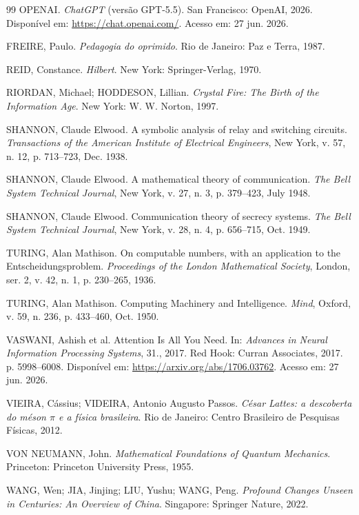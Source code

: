 \documentclass{hipatia}
\begin{document}
{\begin{thebibliography}{99}
OPENAI.
\textit{ChatGPT} (versão GPT-5.5).
San Francisco: OpenAI, 2026.
Disponível em:
\url{https://chat.openai.com/}.
Acesso em: 27 jun. 2026.

FREIRE, Paulo.
\textit{Pedagogia do oprimido}.
Rio de Janeiro: Paz e Terra, 1987.

REID, Constance.
\textit{Hilbert}.
New York: Springer-Verlag, 1970.

RIORDAN, Michael; HODDESON, Lillian.
\textit{Crystal Fire: The Birth of the Information Age}.
New York: W. W. Norton, 1997.

SHANNON, Claude Elwood.
A symbolic analysis of relay and switching circuits.
\textit{Transactions of the American Institute of Electrical Engineers},
New York,
v. 57,
n. 12,
p. 713--723,
Dec. 1938.

SHANNON, Claude Elwood.
A mathematical theory of communication.
\textit{The Bell System Technical Journal},
New York,
v. 27,
n. 3,
p. 379--423,
July 1948.

SHANNON, Claude Elwood.
Communication theory of secrecy systems.
\textit{The Bell System Technical Journal},
New York,
v. 28,
n. 4,
p. 656--715,
Oct. 1949.

TURING, Alan Mathison.
On computable numbers, with an application to the Entscheidungsproblem.
\textit{Proceedings of the London Mathematical Society},
London,
ser. 2,
v. 42,
n. 1,
p. 230--265,
1936.

TURING, Alan Mathison.
Computing Machinery and Intelligence.
\textit{Mind},
Oxford,
v. 59,
n. 236,
p. 433--460,
Oct. 1950.

VASWANI, Ashish et al.
Attention Is All You Need.
In: \textit{Advances in Neural Information Processing Systems},
31., 2017.
Red Hook: Curran Associates, 2017.
p. 5998--6008.
Disponível em:
\url{https://arxiv.org/abs/1706.03762}.
Acesso em: 27 jun. 2026.

VIEIRA, Cássius; VIDEIRA, Antonio Augusto Passos.
\textit{César Lattes: a descoberta do méson $\pi$ e a física brasileira}.
Rio de Janeiro:
Centro Brasileiro de Pesquisas Físicas,
2012.

VON NEUMANN, John.
\textit{Mathematical Foundations of Quantum Mechanics}.
Princeton:
Princeton University Press,
1955.

WANG, Wen;
JIA, Jinjing;
LIU, Yushu;
WANG, Peng.
\textit{Profound Changes Unseen in Centuries: An Overview of China}.
Singapore:
Springer Nature,
2022.


\end{thebibliography}}
\end{document}

